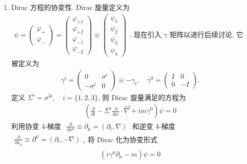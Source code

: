 \documentclass[../../main.tex]{subfiles}
\begin{document}
\begin{enumerate}
    \item Dirac 方程的协变性. Dirac 旋量定义为 $\begin{aligned}
        \psi = \begin{pmatrix}
            \varphi_{+}\\
            \varphi_{-}
        \end{pmatrix} = \begin{pmatrix}
            \varphi_{+1}\\
            \varphi_{+2}\\
            \varphi_{-1}\\
            \varphi_{-2}
        \end{pmatrix} \equiv \begin{pmatrix}
            \psi_{1}\\
            \psi_{2}\\
            \psi_{3}\\
            \psi_{4}
        \end{pmatrix}
    \end{aligned}$. 现在引入 $\gamma$ 矩阵以进行后续讨论, 它被定义为
    \begin{align*}
        \gamma^{i} = \begin{pmatrix}
            0 & \sigma^{i}\\
            -\sigma^{i} & 0
        \end{pmatrix} \equiv -\gamma_{i},\quad \gamma^{0} = \begin{pmatrix}
            I & 0\\
            0 & -I
        \end{pmatrix}.
    \end{align*}
    定义 $\Sigma^{i} = \sigma^{3i},\quad i=\{1,2,3\}$, 则 Dirac 旋量满足的方程为
    \begin{align*}
        \left(\frac{\partial}{\partial t} - \Sigma^{i}\frac{\partial}{\partial x^{i}}\cdot\vec{\nabla} + im\gamma^{0}\right)\psi = 0
    \end{align*}
    利用协变 4-梯度 $\begin{aligned}
        \frac{\partial}{\partial x^{\mu}}\equiv \partial_{\mu} = (\partial_{t},\nabla)
    \end{aligned}$ 和逆变 4-梯度 $\begin{aligned}
        \frac{\partial}{\partial x_{\mu}}\equiv\partial^{\mu} = (\partial_{t},-\nabla)
    \end{aligned}$, 将 Dirac 化为协变形式
    \begin{align*}
        \left(i\gamma^{\mu}\partial_{\mu} - m\right)\psi = 0

\end{align*}
\end{enumerate}
\end{document}
